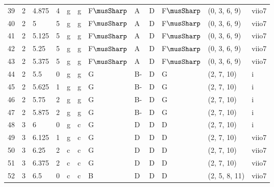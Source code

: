 \begin{tabular}{llllllllllll}
39  & 2       & 4.875  & 4               & g          & g              & F$\musSharp$     & A       & D      & F$\musSharp$        & (0, 3, 6, 9)     & viio7          \\
40  & 2       & 5      & 5               & g          & g              & F$\musSharp$     & A       & D      & F$\musSharp$        & (0, 3, 6, 9)     & viio7          \\
41  & 2       & 5.125  & 5               & g          & g              & F$\musSharp$     & A       & D      & F$\musSharp$        & (0, 3, 6, 9)     & viio7          \\
42  & 2       & 5.25   & 5               & g          & g              & F$\musSharp$     & A       & D      & F$\musSharp$        & (0, 3, 6, 9)     & viio7          \\
43  & 2       & 5.375  & 5               & g          & g              & F$\musSharp$     & A       & D      & F$\musSharp$        & (0, 3, 6, 9)     & viio7          \\
44  & 2       & 5.5    & 0               & g          & g              & G      & B-      & D      & G         & (2, 7, 10)       & i              \\
45  & 2       & 5.625  & 1               & g          & g              & G      & B-      & D      & G         & (2, 7, 10)       & i              \\
46  & 2       & 5.75   & 2               & g          & g              & G      & B-      & D      & G         & (2, 7, 10)       & i              \\
47  & 2       & 5.875  & 2               & g          & g              & G      & B-      & D      & G         & (2, 7, 10)       & i              \\
48  & 3       & 6      & 0               & g          & c              & G      & D       & D      & D         & (2, 7, 10)       & i              \\
49  & 3       & 6.125  & 1               & g          & c              & G      & D       & D      & D         & (2, 7, 10)       & viio7          \\
50  & 3       & 6.25   & 2               & c          & c              & G      & D       & D      & D         & (2, 7, 10)       & viio7          \\
51  & 3       & 6.375  & 2               & c          & c              & G      & D       & D      & D         & (2, 7, 10)       & viio7          \\
52  & 3       & 6.5    & 0               & c          & c              & B      & D       & D      & D         & (2, 5, 8, 11)    & viio7          \\

\end{tabular}
